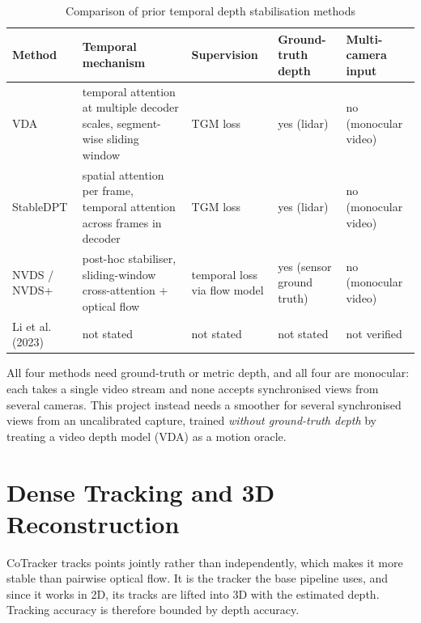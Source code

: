 \begin{table}[H]
	\caption{Comparison of prior temporal depth stabilisation methods}
	\label{tab:bg-temporal}
	\begin{center}
		\begin{tabular}{@{}>{\raggedright\arraybackslash}p{2.2cm}
		                  >{\raggedright\arraybackslash}p{4.6cm}
		                  >{\raggedright\arraybackslash}p{2.4cm}
		                  >{\raggedright\arraybackslash}p{2.2cm}
		                  >{\raggedright\arraybackslash}p{2.4cm}@{}}
			\toprule
			Method & Temporal mechanism & Supervision & Ground-truth depth & Multi-camera input \\
			\midrule
			VDA & temporal attention at multiple decoder scales,
			                      segment-wise sliding window & TGM loss & yes (lidar) & no (monocular video) \\
			StableDPT & spatial attention per frame, temporal
			                      attention across frames in decoder & TGM loss & yes (lidar) & no (monocular video) \\
			NVDS / NVDS+ & post-hoc stabiliser, sliding-window
			                      cross-attention + optical flow & temporal loss via flow
			                      model & yes (sensor ground truth) & no (monocular video) \\
			Li et al. (2023) & not stated & not stated & not stated & not verified \\
			\bottomrule
		\end{tabular}
	\end{center}
\end{table}


All four methods need ground-truth or metric depth, and all four are monocular: each takes a single
video stream and none accepts synchronised views from several cameras. This project
instead needs a smoother for several synchronised views from an uncalibrated capture, trained
\emph{without ground-truth depth} by treating a video depth model (VDA) as a motion oracle.

\section{Dense Tracking and 3D Reconstruction}
\label{sec:bg-tracking}

CoTracker \parencite{cotracker} tracks points jointly rather than independently, which makes it
more stable than pairwise optical flow. It is the tracker the base pipeline uses, and since it
works in 2D, its tracks are lifted into 3D with the estimated depth. Tracking accuracy is
therefore bounded by depth accuracy.

